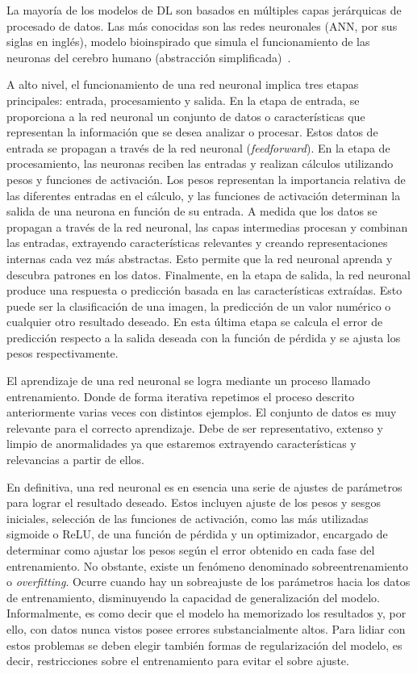 La mayoría de los modelos de DL son basados en múltiples capas jerárquicas de 
procesado de datos. Las más conocidas son las redes neuronales (ANN, por sus siglas 
en inglés), modelo bioinspirado que simula el funcionamiento de las neuronas del cerebro
humano (abstracción simplificada)~\cite{ANNForPattern,ANNCambridge}. 

A alto nivel, el funcionamiento de una red neuronal implica tres etapas principales: 
entrada, procesamiento y salida. En la etapa de entrada, se proporciona a la red 
neuronal un conjunto de datos o características que representan la información 
que se desea analizar o procesar. Estos datos de entrada se propagan a través 
de la red neuronal (\emph{feedforward}). En la etapa de procesamiento, las neuronas reciben las entradas 
y realizan cálculos utilizando pesos y funciones de activación. Los pesos representan 
la importancia relativa de las diferentes entradas en el cálculo, y las funciones 
de activación determinan la salida de una neurona en función de su entrada. A medida que los datos se propagan a través de la red neuronal, las capas intermedias 
procesan y combinan las entradas, extrayendo características relevantes y creando 
representaciones internas cada vez más abstractas. Esto permite que la red neuronal aprenda y 
descubra patrones en los datos. Finalmente, en la etapa de salida, la red neuronal 
produce una respuesta o predicción basada en las características extraídas. 
Esto puede ser la clasificación de una imagen, la predicción de un valor numérico o 
cualquier otro resultado deseado. En esta última etapa se calcula el error de 
predicción respecto a la salida deseada con la función de pérdida y se ajusta 
los pesos respectivamente.

El aprendizaje de una red neuronal se logra mediante un proceso llamado entrenamiento.
Donde de forma iterativa repetimos el proceso descrito anteriormente varias veces 
con distintos ejemplos. El conjunto de datos es muy relevante para el correcto 
aprendizaje. Debe de ser representativo, extenso y limpio de anormalidades ya que 
estaremos extrayendo características y relevancias a partir de ellos.

En definitiva, una red neuronal es en esencia una serie de ajustes de parámetros para lograr el resultado deseado. 
Estos incluyen ajuste de los pesos y sesgos iniciales, selección de las funciones de activación, 
como las más utilizadas sigmoide o ReLU, de una función de pérdida y un optimizador, 
encargado de determinar como ajustar los pesos según el error obtenido en cada fase del entrenamiento.
No obstante, existe un fenómeno denominado sobreentrenamiento o \emph{overfitting}. 
Ocurre cuando hay un sobreajuste de los parámetros
hacia los datos de entrenamiento, disminuyendo la capacidad de generalización del modelo. 
Informalmente, es como decir que el modelo ha memorizado los resultados y, por ello, 
con datos nunca vistos posee errores substancialmente altos. Para lidiar con estos 
problemas se deben elegir también formas de regularización del modelo, es decir, 
restricciones sobre el entrenamiento para evitar el sobre ajuste. 

